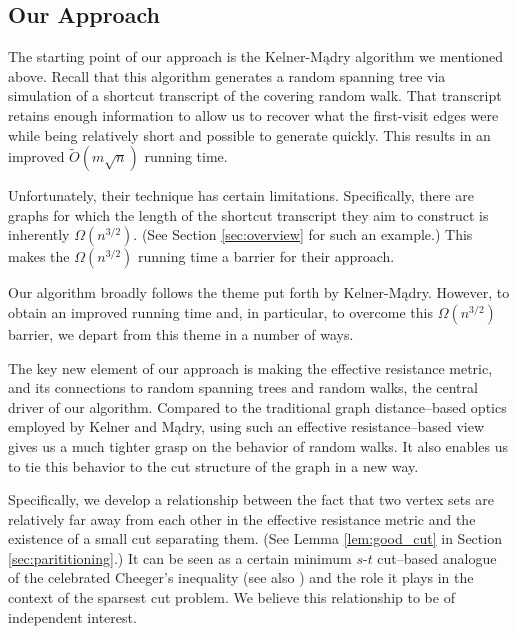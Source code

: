 \documentclass[11pt, letterpaper]{article}
\newcommand{\tO}{\widetilde{O}}
\begin{document}
\subsection{Our Approach}\label{sec:our_approach}

The starting point of our approach is the Kelner-Mądry algorithm \cite{KelnerM09} we mentioned above. Recall that this algorithm generates a random spanning tree via simulation of a shortcut transcript of the covering random walk. That transcript retains enough information to allow us to recover what the first-visit edges were while being relatively short and possible to generate quickly. This results in an improved $\tO(m\sqrt{n})$ running time. 

Unfortunately, their technique has certain limitations. Specifically, there are graphs for which the length of the shortcut transcript they aim to construct is inherently $\Omega(n^{3/2})$. (See Section \ref{sec:overview} for such an example.) This makes the $\Omega(n^{3/2})$ running time a barrier for their approach.

Our algorithm broadly follows the theme put forth by Kelner-Mądry. However, to obtain an improved running time and, in particular, to overcome this $\Omega(n^{3/2})$ barrier, we depart from this theme in a number of ways. 

The key new element of our approach is making the effective resistance metric, and its connections to random spanning trees and random walks, the central driver of our algorithm. Compared to the traditional graph distance--based optics employed by Kelner and Mądry, using such an effective resistance--based view gives us a much tighter grasp on the behavior of random walks. It also enables us to tie this behavior to the cut structure of the graph in a new way. 

Specifically, we develop a relationship between the fact that two vertex sets are relatively far away from each other in the effective resistance metric and the existence of a small cut separating them. (See Lemma \ref{lem:good_cut} in Section \ref{sec:parititioning}.)  It can be seen as a certain minimum $s$-$t$ cut--based analogue of the celebrated Cheeger's inequality \cite{AlonM85,Alon86} (see also \cite{KwokLLOT13}) and the role it plays in the context of the sparsest cut problem. We believe this relationship to be of independent interest.
\end{document}
